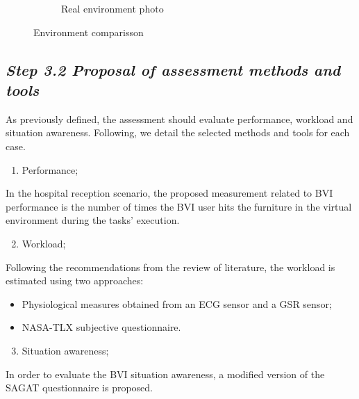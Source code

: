 \begin{figure}[!htb]
\begin{subfigure}[b]{0.49\textwidth}
                \caption{Real environment photo}
                \label{fig:re_photo}
            \end{subfigure}
               \caption{Environment comparisson}
               \label{fig:ve_re}
        \end{figure}

    \subsection*{\textit{Step 3.2 Proposal of assessment methods and tools}}

        As previously defined, the assessment should evaluate performance, workload and situation awareness. Following, we detail the selected methods and tools for each case.

        \begin{enumerate} [label = \Alph*)]
            \item Performance;
        \end{enumerate}
            
        In the hospital reception scenario, the proposed measurement related to BVI performance is the number of times the BVI user hits the furniture in the virtual environment during the tasks’ execution.

        \begin{enumerate} [label = \Alph*)]
            \setcounter{enumi}{1}
            \item Workload;
        \end{enumerate}

        Following the recommendations from the review of literature, the workload is estimated using two approaches:
        \begin{itemize}
            \item Physiological measures obtained from an ECG sensor and a GSR sensor;
            \item NASA-TLX subjective questionnaire.           
        \end{itemize}

        \begin{enumerate} [label = \Alph*)]
            \setcounter{enumi}{2}
            \item Situation awareness;
        \end{enumerate}

        In order to evaluate the BVI situation awareness, a modified version of the SAGAT questionnaire is proposed.

